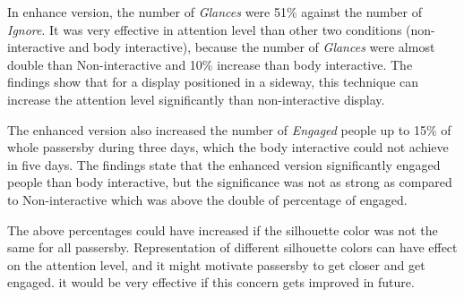 In enhance version, the number of \emph{Glances} were 51\% against the number of \emph{Ignore}. It was very effective in attention level than other two conditions (non-interactive and body interactive), because the number of \emph{Glances} were almost double than Non-interactive and 10\% increase than body interactive. The findings show that for a display positioned in a sideway, this technique can increase the attention level significantly than non-interactive display.

The enhanced version also increased the number of \emph{Engaged} people up to 15\% of whole passersby during three days, which the body interactive could not achieve in five days. The findings state that the enhanced version significantly engaged people than body interactive, but the significance was not as strong as compared to Non-interactive which was above the double of percentage of engaged. 

The above percentages could have increased if the silhouette color was not the same for all passersby. Representation of different silhouette colors can have effect on the attention level, and it might motivate passersby to get closer and get engaged. it would be very effective if this concern gets improved in future.





